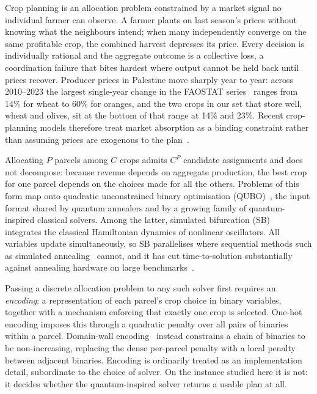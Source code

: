\documentclass[conference,a4paper]{IEEEtran}
\begin{document}
Crop planning is an allocation problem constrained by a market signal no
individual farmer can observe. A farmer plants on last season's prices without
knowing what the neighbours intend; when many independently converge on the
same profitable crop, the combined harvest depresses its price. Every decision
is individually rational and the aggregate outcome is a collective loss, a
coordination failure that bites hardest where output cannot be held back until
prices recover. Producer prices in Palestine move sharply year to year: across
2010--2023 the largest single-year change in the FAOSTAT series~\cite{faostat}
ranges from 14\% for wheat to 60\% for oranges, and the two crops in our set
that store well, wheat and olives, sit at the bottom of that range at 14\% and
23\%. Recent crop-planning models therefore treat market absorption as a
binding constraint rather than assuming prices are exogenous to the
plan~\cite{li2025,hou2026}.

Allocating $P$ parcels among $C$ crops admits $C^P$ candidate assignments and
does not decompose: because revenue depends on aggregate production, the best
crop for one parcel depends on the choices made for all the others. Problems
of this form map onto quadratic unconstrained binary optimisation
(QUBO)~\cite{lucas2014,glover2019}, the input format shared by quantum
annealers and by a growing family of quantum-inspired classical solvers. Among
the latter, simulated bifurcation (SB)~\cite{goto2021} integrates the
classical Hamiltonian dynamics of nonlinear oscillators. All variables update
simultaneously, so SB parallelises where sequential methods such as simulated
annealing~\cite{kirkpatrick1983} cannot, and it has cut time-to-solution
substantially against annealing hardware on large benchmarks~\cite{zeng2024}.

Passing a discrete allocation problem to any such solver first requires an
\emph{encoding}: a representation of each parcel's crop choice in binary
variables, together with a mechanism enforcing that exactly one crop is
selected. One-hot encoding imposes this through a quadratic penalty over all
pairs of binaries within a parcel. Domain-wall encoding~\cite{chancellor2019}
instead constrains a chain of binaries to be non-increasing, replacing the
dense per-parcel penalty with a local penalty between adjacent binaries.
Encoding is ordinarily treated as an implementation detail, subordinate to the
choice of solver. On the instance studied here it is not: it decides whether
the quantum-inspired solver returns a usable plan at all.
\end{document}
